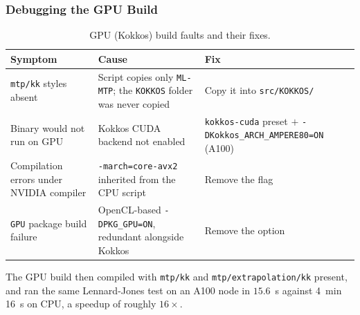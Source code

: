 \documentclass{article}
\begin{document}
\subsubsection{Debugging the GPU Build}

\begin{table}[H]
\centering
\small
\begin{tabular}{p{}|p{}|p{}}
\toprule
Symptom & Cause & Fix \\
\midrule
\texttt{mtp/kk} styles absent & Script copies only \texttt{ML-MTP}; the \texttt{KOKKOS} folder was never copied & Copy it into \texttt{src/KOKKOS/} \\
\hline
Binary would not run on GPU & Kokkos CUDA backend not enabled & \texttt{kokkos-cuda} preset $+$ \texttt{-DKokkos\_ARCH\_AMPERE80=ON} (A100) \\
\hline
Compilation errors under NVIDIA compiler & \texttt{-march=core-avx2} inherited from the CPU script & Remove the flag \\
\hline
\texttt{GPU} package build failure & OpenCL-based \texttt{-DPKG\_GPU=ON}, redundant alongside Kokkos & Remove the option \\
\bottomrule
\end{tabular}
\caption{GPU (Kokkos) build faults and their fixes.}
\label{tab:buildfaults-gpu}
\end{table}

The GPU build then compiled with \texttt{mtp/kk} and \texttt{mtp/extrapolation/kk} present, and ran the same Lennard-Jones test on an A100 node in $15.6$~s against 4~min 16~s on CPU, a speedup of roughly $16\times$.
\end{document}

